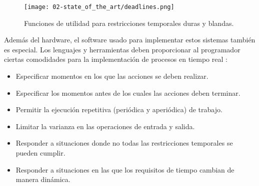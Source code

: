 \begin{figure}
  \centering
  \texttt{[image: 02-state\_of\_the\_art/deadlines.png]}
  \caption{Funciones de utilidad para restricciones temporales duras y blandas.}
  \label{fig:02-deadlines}
\end{figure}

Además del hardware, el software usado para implementar estos sistemas también
es especial. Los lenguajes y herramientas deben proporcionar al programador
ciertas comodidades para la implementación de procesos en tiempo real
\cite{burns_real-time_2009}:

\begin{itemize}
  \item Especificar momentos en los que las acciones se deben realizar.
  \item Especificar los momentos antes de los cuales las acciones deben terminar.
  \item Permitir la ejecución repetitiva (periódica y aperiódica) de trabajo.
  \item Limitar la varianza en las operaciones de entrada y salida.
  \item Responder a situaciones donde no todas las restricciones temporales se
        pueden cumplir.
  \item Responder a situaciones en las que los requisitos de tiempo cambian de
        manera dinámica.
\end{itemize}

